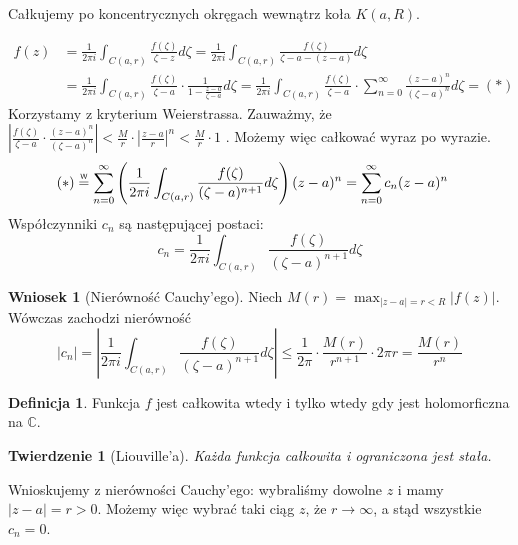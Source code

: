 \documentclass[11pt]{article}
\newcommand{\abs}[1]{\left|#1\right|} %
\newcommand{\eqtext}[1]{\overset{\text{\tiny\sffamily #1}}{=}} %
\theoremstyle{plain}
\newtheorem*{theorem}{Twierdzenie}
\theoremstyle{definition}
\newtheorem*{definition}{Definicja}
\newtheorem*{corollary}{Wniosek}
\theoremstyle{remark}
\let\oldendproof\endproof
\renewenvironment{proof}[1][\proofname]{
  \oldproof[\textsc{\small #1}]
}{\oldendproof}
\begin{document}
\begin{proof}
  Całkujemy po koncentrycznych okręgach wewnątrz koła $ K(a, R) $.

  \begin{align*}
    f(z) &
    = \frac{1}{2 \pi i} \int_{C(a, r)} \frac{f(\zeta)}{\zeta-z} d\zeta
    = \frac{1}{2 \pi i} \int_{C(a, r)} \frac{f(\zeta)}{\zeta-a-(z-a)} d\zeta \\ &
    = \frac{1}{2 \pi i} \int_{C(a, r)} \frac{f(\zeta)}{\zeta-a} \cdot \frac{1}{1 - \frac{z-a}{\zeta-a}} d\zeta
    = \frac{1}{2 \pi i} \int_{C(a, r)} \frac{f(\zeta)}{\zeta-a} \cdot \sum_{n=0}^{\infty} \frac{(z-a)^{n}}{(\zeta-a)^{n}} d\zeta = (*)
  \end{align*}
  Korzystamy z kryterium Weierstrassa. Zauważmy, że
  $
    \abs{\frac{f(\zeta)}{\zeta-a} \cdot \frac{(z-a)^{n}}{(\zeta-a)^{n}}}
    < \frac{M}{r} \cdot \abs{\frac{z-a}{r}}^n
    < \frac{M}{r} \cdot 1
  $
  . Możemy więc całkować wyraz po wyrazie.
  \begin{align*}
    (*) &
    \eqtext{W} \sum_{n=0}^{\infty} \left( \frac{1}{2 \pi i} \int_{C(a, r)} \frac{f(\zeta)}{(\zeta-a)^{n+1}} d\zeta \right)(z-a)^{n}
    = \sum_{n = 0}^{\infty} c_{n}(z-a)^{n}
  \end{align*}
  Współczynniki $ c_{n} $ są następującej postaci:
  $$
    c_{n} = \frac{1}{2 \pi i} \int_{C(a, r)} \frac{f(\zeta)}{(\zeta-a)^{n+1}} d\zeta
  $$
\end{proof}

\begin{corollary}[Nierówność Cauchy'ego]
  Niech $ M(r) = \max_{\abs{z-a} = r < R} \abs{f(z)} $. Wówczas zachodzi nierówność
  $$ \abs{c_{n}} = \abs{ \frac{1}{2 \pi i} \int_{C(a, r)} \frac{f(\zeta)}{(\zeta-a)^{n+1}} d\zeta } \leq \frac{1}{2 \pi} \cdot \frac{M(r)}{r^{n+1}} \cdot 2 \pi r = \frac{M(r)}{r^n} $$
\end{corollary}

\begin{definition}
  Funkcja $ f $ jest całkowita wtedy i tylko wtedy gdy jest holomorficzna na $ \mathbb{C} $.
\end{definition}

\begin{theorem}[Liouville'a]
  Każda funkcja całkowita i ograniczona jest stała.
\end{theorem}

\begin{proof}
  Wnioskujemy z nierówności Cauchy'ego: wybraliśmy dowolne $ z $ i mamy $ \abs{z-a} = r > 0 $. Możemy więc wybrać taki ciąg $ z $, że $ r \to \infty $, a stąd wszystkie $ c_{n} = 0 $. 
\end{proof}
\end{document}
